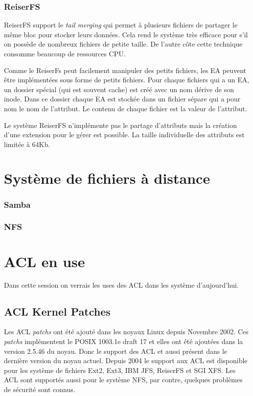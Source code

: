 \subsubsection*{ReiserFS}

ReiserFS support le \emph{tail merging} qui permet à plusieurs fichiers de partager le même bloc pour stocker leurs données. Cela rend le système très efficace pour s'il on possède de nombreux fichiers de petite taille. De l'autre côte cette technique consomme beaucoup de ressources CPU. 
	
Comme le ReiserFs peut facilement manipuler des petits fichiers, les EA peuvent être implémentées sous forme de petits fichiers. Pour chaque fichiers qui a un EA, un dossier spécial (qui est souvent cache) est créé avec un nom dérive de son inode. Dans ce dossier chaque EA est stockée dans un fichier sépare qui a pour nom le nom de l'attribut. Le contenu de chaque fichier est la valeur de l'attribut.

Le système ReiserFS n'implémente pas le partage d'attributs mais la création d'une extension pour le gérer est possible. La taille individuelle des attributs est limitée à 64Kb.

\section*{Système de fichiers à distance}
\subsubsection*{Samba}
\subsubsection*{NFS}

\section{ACL en use}

Dans cette session on verrais les uses des ACL dans les système d'aujourd'hui. 

\subsection{ACL Kernel Patches}
Les ACL \emph{patchs} ont été ajouté dans les noyaux Linux depuis Novembre 2002. Ces \emph{patchs} implémentent le POSIX 1003.1e draft 17 et elles ont été ajoutées dans la version 2.5.46 du noyau. Donc le support des ACL et aussi présent dans le dernière version du noyau actuel. Depuis 2004 le support aux ACL est disponible pour les système de fichiers Ext2, Ext3, IBM JFS, ReiserFS et SGI XFS. Les ACL sont supportés aussi pour le système NFS, par contre, quelques problèmes de sécurité sont connus\cite{nfs_problem}. 

